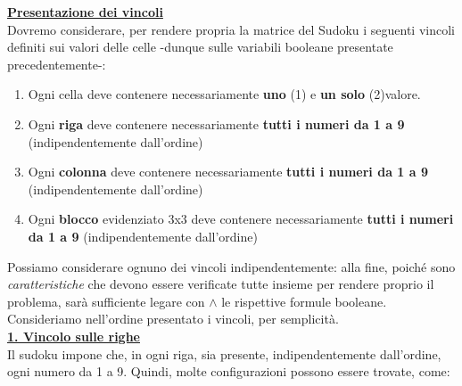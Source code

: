 \documentclass[a4paper,10pt]{article}
\begin{document}
{\begin{itemize}[label=, leftmargin=0pt]
\begin{osservazioni}
\underline{\textbf{Presentazione dei vincoli}}\\
Dovremo considerare, per rendere propria la matrice del Sudoku i seguenti vincoli definiti sui valori delle celle -dunque sulle variabili booleane presentate precedentemente-:
\begin{enumerate}
    \item Ogni cella deve contenere necessariamente \textbf{uno} (1) e \textbf{un solo} (2)valore.
    \item Ogni \textbf{riga} deve contenere necessariamente \textbf{tutti i numeri da 1 a 9} (indipendentemente dall'ordine)
    \item Ogni \textbf{colonna} deve contenere necessariamente \textbf{tutti i numeri da 1 a 9} (indipendentemente dall'ordine)
    \item Ogni \textbf{blocco} evidenziato 3x3 deve contenere necessariamente \textbf{tutti i numeri da 1 a 9} (indipendentemente dall'ordine)
\end{enumerate}
Possiamo considerare ognuno dei vincoli indipendentemente: alla fine, poiché sono \textit{caratteristiche} che devono essere verificate tutte insieme per rendere proprio il problema, sarà sufficiente legare con $\land$ le rispettive formule booleane.\\
Consideriamo nell'ordine presentato i vincoli, per semplicità.\\

\underline{\textbf{1. Vincolo sulle righe}}\\
Il sudoku impone che, in ogni riga, sia presente, indipendentemente dall'ordine, ogni numero da 1 a 9. Quindi, molte configurazioni possono essere trovate, come:

  \begin{center}
    \end{center}


\end{osservazioni}
\end{itemize}}
\end{document}
